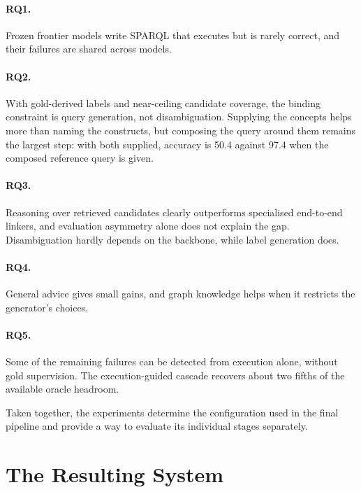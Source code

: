 \paragraph{RQ1.}

Frozen frontier models write SPARQL that executes but is rarely correct, and their failures are shared across models.

\paragraph{RQ2.}

With gold-derived labels and near-ceiling candidate coverage, the binding constraint is query generation, not disambiguation.
Supplying the concepts helps more than naming the constructs, but composing the query around them remains the largest step: with both supplied, accuracy is 50.4 against 97.4 when the composed reference query is given.

\paragraph{RQ3.}

Reasoning over retrieved candidates clearly outperforms specialised end-to-end linkers, and evaluation asymmetry alone does not explain the gap.
Disambiguation hardly depends on the backbone, while label generation does.

\paragraph{RQ4.}

General advice gives small gains, and graph knowledge helps when it restricts the generator's choices.

\paragraph{RQ5.}

Some of the remaining failures can be detected from execution alone, without gold supervision.
The execution-guided cascade recovers about two fifths of the available oracle headroom.

Taken together, the experiments determine the configuration used in the final pipeline and provide a way to evaluate its individual stages separately.
\section{The Resulting System}

